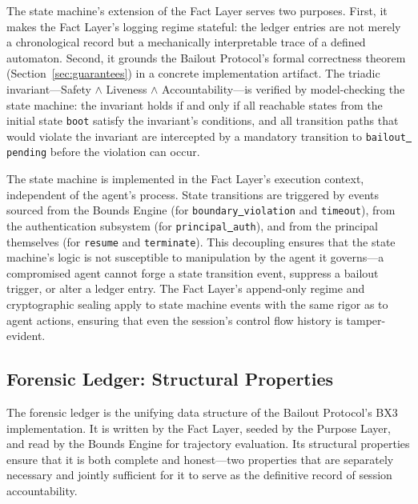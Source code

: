 The state machine's extension of the Fact Layer serves two purposes. First, it makes the Fact Layer's logging regime stateful: the ledger entries are not merely a chronological record but a mechanically interpretable trace of a defined automaton. Second, it grounds the Bailout Protocol's formal correctness theorem (Section~\ref{sec:guarantees}) in a concrete implementation artifact. The triadic invariant—Safety $\land$ Liveness $\land$ Accountability—is verified by model-checking the state machine: the invariant holds if and only if all reachable states from the initial state \texttt{boot} satisfy the invariant's conditions, and all transition paths that would violate the invariant are intercepted by a mandatory transition to \texttt{bailout\underline{ }pending} before the violation can occur.

The state machine is implemented in the Fact Layer's execution context, independent of the agent's process. State transitions are triggered by events sourced from the Bounds Engine (for \texttt{boundary\underline{ }violation} and \texttt{timeout}), from the authentication subsystem (for \texttt{principal\underline{ }auth}), and from the principal themselves (for \texttt{resume} and \texttt{terminate}). This decoupling ensures that the state machine's logic is not susceptible to manipulation by the agent it governs—a compromised agent cannot forge a state transition event, suppress a bailout trigger, or alter a ledger entry. The Fact Layer's append-only regime and cryptographic sealing apply to state machine events with the same rigor as to agent actions, ensuring that even the session's control flow history is tamper-evident.

\subsection{Forensic Ledger: Structural Properties}

The forensic ledger is the unifying data structure of the Bailout Protocol's BX3 implementation. It is written by the Fact Layer, seeded by the Purpose Layer, and read by the Bounds Engine for trajectory evaluation. Its structural properties ensure that it is both complete and honest—two properties that are separately necessary and jointly sufficient for it to serve as the definitive record of session accountability.

